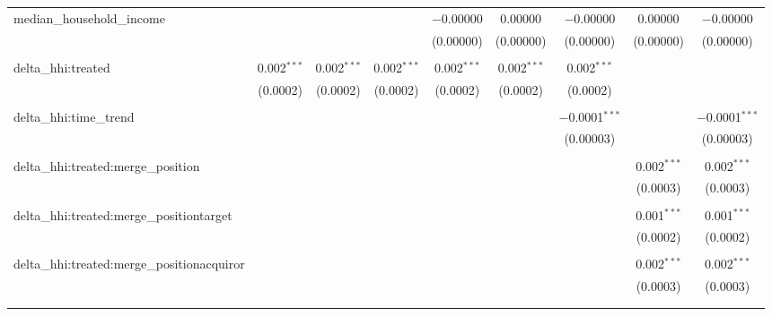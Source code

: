 \begin{table}[H]
{\begin{tabular}{@{\extracolsep{5pt}}lcccccccc}
  median\_household\_income &  &  &  & $-$0.00000 & 0.00000 & $-$0.00000 & 0.00000 & $-$0.00000 \\  

   &  &  &  & (0.00000) & (0.00000) & (0.00000) & (0.00000) & (0.00000) \\  

   & & & & & & & & \\  

  delta\_hhi:treated & 0.002$^{***}$ & 0.002$^{***}$ & 0.002$^{***}$ & 0.002$^{***}$ & 0.002$^{***}$ & 0.002$^{***}$ &  &  \\  

   & (0.0002) & (0.0002) & (0.0002) & (0.0002) & (0.0002) & (0.0002) &  &  \\  

   & & & & & & & & \\  

  delta\_hhi:time\_trend &  &  &  &  &  & $-$0.0001$^{***}$ &  & $-$0.0001$^{***}$ \\  

   &  &  &  &  &  & (0.00003) &  & (0.00003) \\  

   & & & & & & & & \\  

  delta\_hhi:treated:merge\_position &  &  &  &  &  &  & 0.002$^{***}$ & 0.002$^{***}$ \\  

   &  &  &  &  &  &  & (0.0003) & (0.0003) \\  

   & & & & & & & & \\  

  delta\_hhi:treated:merge\_positiontarget &  &  &  &  &  &  & 0.001$^{***}$ & 0.001$^{***}$ \\  

   &  &  &  &  &  &  & (0.0002) & (0.0002) \\  

   & & & & & & & & \\  

  delta\_hhi:treated:merge\_positionacquiror &  &  &  &  &  &  & 0.002$^{***}$ & 0.002$^{***}$ \\  

   &  &  &  &  &  &  & (0.0003) & (0.0003) \\  

   & & & & & & & & \\  

 \hline \\[-1.8ex]  


\end{tabular}}
\end{table}
